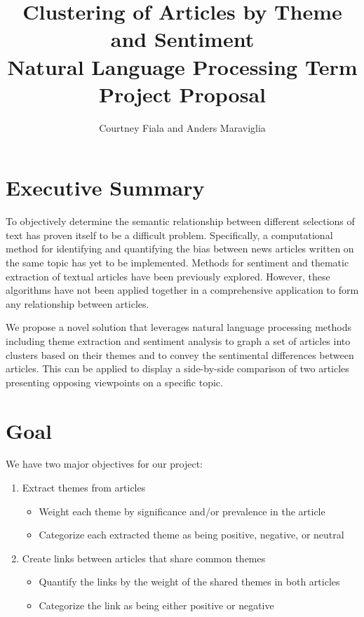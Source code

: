 \documentclass[12pt]{article}
\begin{document}
\title{Clustering of Articles by Theme and Sentiment \\ {\Large Natural Language Processing Term Project Proposal}}
\author{Courtney Fiala and Anders Maraviglia}

\maketitle

\section{Executive Summary}
To objectively determine the semantic relationship between different selections of text has proven itself to be a difficult problem. Specifically, a computational method for identifying and quantifying the bias between news articles written on the same topic has yet to be implemented. Methods for sentiment and thematic extraction of textual articles have been previously explored. However, these algorithms have not been applied together in a comprehensive application to form any relationship between articles.

We propose a novel solution that leverages natural language processing methods including theme extraction and sentiment analysis to graph a set of articles into clusters based on their themes and to convey the sentimental differences between articles. This can be applied to display a side-by-side comparison of two articles presenting opposing viewpoints on a specific topic.

\section{Goal}
We have two major objectives for our project:
\begin{enumerate}
\item Extract themes from articles
\begin{itemize}
\item Weight each theme by significance and/or prevalence in the article
\item Categorize each extracted theme as being positive, negative, or neutral
\end{itemize}

\item Create links between articles that share common themes
\begin{itemize}
\item Quantify the links by the weight of the shared themes in both articles
\item Categorize the link as being either positive or negative
\end{itemize}
\end{enumerate}
\end{document}
